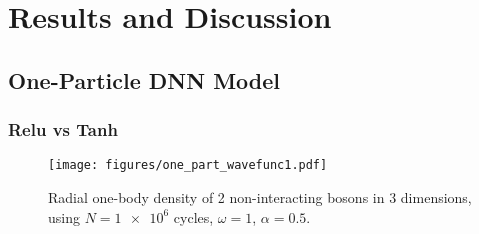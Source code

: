 \section{Results and Discussion}\label{sec:Discussion}

\subsection{One-Particle DNN Model}
\subsubsection{Relu vs Tanh}

\begin{figure}[ht]
	\texttt{[image: figures/one\_part\_wavefunc1.pdf]}
	\caption{Radial one-body density of 2 non-interacting bosons in 3 dimensions, using $N = \num{1e6}$ cycles, $\omega = 1$, $\alpha = 0.5$.}
	\label{fig:2 part 3 dim density}
\end{figure}


\subsection{}


